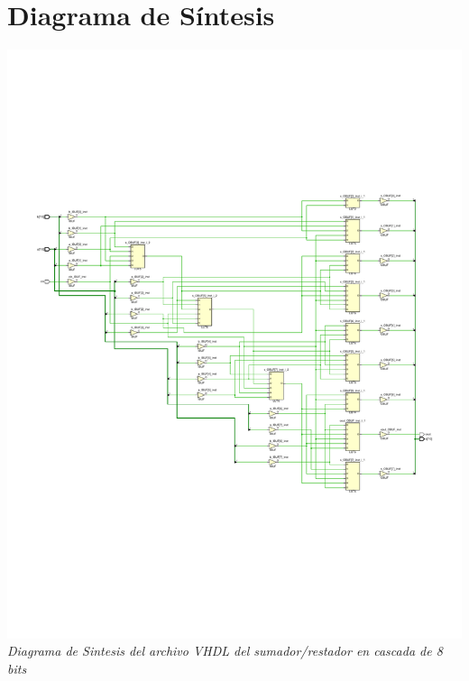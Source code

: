 \documentclass[12pt,executivepaper]{article}
\begin{document}
\section{Diagrama de Síntesis}
\begin{center}
    \includegraphics[scale=0.7]{sources/synthesisDiagram.pdf}
    \textit{Diagrama de Sintesis del archivo VHDL del sumador/restador en cascada de 8 bits}
\end{center}
\end{document}
